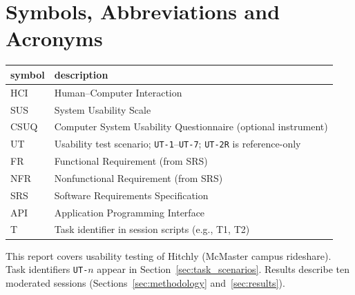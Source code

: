 \section{Symbols, Abbreviations and Acronyms}

\renewcommand{\arraystretch}{1.2}
\begin{tabularx}{\textwidth}{l X}
  \toprule
  \textbf{symbol} & \textbf{description}\\
  \midrule
  HCI & Human--Computer Interaction\\
  SUS & System Usability Scale\\
  CSUQ & Computer System Usability Questionnaire (optional instrument)\\
  UT & Usability test scenario; \texttt{UT-1}--\texttt{UT-7}; \texttt{UT-2R} is reference-only\\
  FR & Functional Requirement (from SRS)\\
  NFR & Nonfunctional Requirement (from SRS)\\
  SRS & Software Requirements Specification\\
  API & Application Programming Interface\\
  T & Task identifier in session scripts (e.g., T1, T2)\\
  \bottomrule
\end{tabularx}

\newpage

\tableofcontents

\listoftables

\listoffigures

\newpage


This report covers usability testing of Hitchly (McMaster campus ride\-share). Task identifiers \texttt{UT-$n$} appear in Section~\ref{sec:task_scenarios}. Results describe ten moderated sessions (Sections~\ref{sec:methodology} and~\ref{sec:results}).
